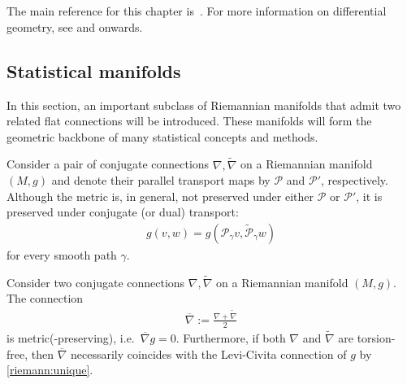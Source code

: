 \chapter{}\label{chapter:info}

    The main reference for this chapter is~\citet{amari_information_2016}. For more information on differential geometry, see  and onwards.

    \minitoc

\section{Statistical manifolds}

    In this section, an important subclass of Riemannian manifolds that admit two related flat connections will be introduced. These manifolds will form the geometric backbone of many statistical concepts and methods.

    \begin{property}
        Consider a pair of conjugate connections $\nabla,\widetilde{\nabla}$ on a Riemannian manifold $(M,g)$ and denote their parallel transport maps by $\mathcal{P}$ and $\mathcal{P}'$, respectively. Although the metric is, in general, not preserved under either $\mathcal{P}$ or $\mathcal{P}'$, it is preserved under conjugate (or dual) transport:
        \begin{gather}
            g(v,w) = g\left(\mathcal{P}_\gamma v,\widetilde{\mathcal{P}}_\gamma w\right)
        \end{gather}
        for every smooth path $\gamma$.
    \end{property}

    \begin{property}
        Consider two conjugate connections $\nabla,\widetilde{\nabla}$ on a Riemannian manifold $(M,g)$. The connection
        \begin{gather}
            \overline{\nabla} := \frac{\nabla+\widetilde{\nabla}}{2}
        \end{gather}
        is metric(-preserving), i.e.~$\overline{\nabla}g=0$. Furthermore, if both $\nabla$ and $\widetilde{\nabla}$ are torsion-free, then $\overline{\nabla}$ necessarily coincides with the Levi-Civita connection of $g$ by \cref{riemann:unique}.
    \end{property}

